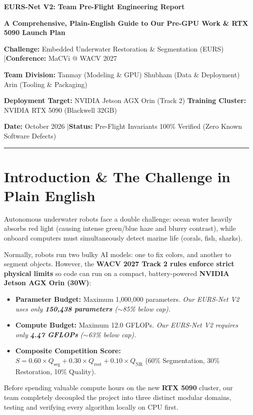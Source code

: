 \documentclass[10pt,a4paper]{article}
\begin{document}
\begin{center}
    {\LARGE \textbf{\color{navyblue}EURS-Net V2: Team Pre-Flight Engineering Report}}\par\vspace{3pt}
    {\large \textbf{\color{accentblue}A Comprehensive, Plain-English Guide to Our Pre-GPU Work \& RTX 5090 Launch Plan}}\par\vspace{6pt}
    {\small \textbf{Challenge:} Embedded Underwater Restoration \& Segmentation (EURS) \quad|\quad \textbf{Conference:} MaCVi @ WACV 2027}\par\vspace{2pt}
    {\small \textbf{Team Division:} Tanmay (Modeling \& GPU) \quad\textbullet\quad Shubham (Data \& Deployment) \quad\textbullet\quad Arin (Tooling \& Packaging)}\par\vspace{2pt}
    {\small \textbf{Deployment Target:} NVIDIA Jetson AGX Orin (Track 2) \quad\textbullet\quad \textbf{Training Cluster:} NVIDIA RTX 5090 (Blackwell 32GB)}\par\vspace{2pt}
    {\small \textbf{Date:} October 2026 \quad|\quad \textbf{Status:} Pre-Flight Invariants 100\% Verified (Zero Known Software Defects)}
\end{center}

\vspace{0.2em}
\hrule
\vspace{0.6em}

\section{Introduction \& The Challenge in Plain English}
Autonomous underwater robots face a double challenge: ocean water heavily absorbs red light (causing intense green/blue haze and blurry contrast), while onboard computers must simultaneously detect marine life (corals, fish, sharks). 

Normally, robots run two bulky AI models: one to fix colors, and another to segment objects. However, the \textbf{WACV 2027 Track 2 rules enforce strict physical limits} so code can run on a compact, battery-powered \textbf{NVIDIA Jetson AGX Orin (30W)}:
\begin{itemize}[noitemsep,topsep=1pt]
    \item \textbf{Parameter Budget:} Maximum 1,000,000 parameters. \textit{Our EURS-Net V2 uses only \textbf{150,438 parameters} ($\sim$85\% below cap).}
    \item \textbf{Compute Budget:} Maximum 12.0 GFLOPs. \textit{Our EURS-Net V2 requires only \textbf{4.47 GFLOPs} ($\sim$63\% below cap).}
    \item \textbf{Composite Competition Score:} $S = 0.60 \times Q_{\text{seg}} + 0.30 \times Q_{\text{rest}} + 0.10 \times Q_{\text{NR}}$ (60\% Segmentation, 30\% Restoration, 10\% Quality).
\end{itemize}
Before spending valuable compute hours on the new \textbf{RTX 5090} cluster, our team completely decoupled the project into three distinct modular domains, testing and verifying every algorithm locally on CPU first.
\end{document}
